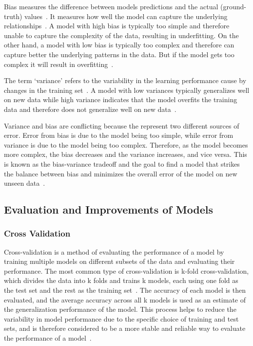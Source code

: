 Bias measures the difference between models predictions and the actual
(ground-truth) values~\cite[p. 51]{zhou_machinelearning_2021}.
It measures how well the model can capture the underlying
relationships~\cite[p. 7--8]{neal_biasvariancetradeofftextbooks_2019}.
A model with high bias is typically too simple and therefore unable to capture the complexity of the data, resulting
in underfitting.
On the other hand, a model with low bias is typically too complex and therefore can capture better the underlying
patterns in the data. But if the model gets too complex it will result in
overfitting~\cite[p. 20]{neal_biasvariancetradeofftextbooks_2019}.

The term `variance' refers to the variability in the learning performance cause by changes in the training
set~\cite[p. 51]{zhou_machinelearning_2021}.
A model with low variances typically generalizes well on new data while high variance indicates that the model
overfits the training data and therefore does not generalize well on new
data~\cite[p. 7--8]{neal_biasvariancetradeofftextbooks_2019}.

Variance and bias are conflicting because the represent two different sources of error.
Error from bias is due to the model being too simple, while error from variance is due to the model being too
complex.
Therefore, as the model becomes more complex, the bias decreases and the variance increases, and vice versa.
This is known as the bias-variance tradeoff and the goal to find a model that strikes the balance between
bias and minimizes the overall error of the model on new unseen
data~\cite[p. 9]{neal_biasvariancetradeofftextbooks_2019}.

\subsection{Evaluation and Improvements of Models}\label{subsec:evaluations-and-improvements-of-models}

\subsubsection{Cross Validation}\label{subsubsec:cross-validation}
Cross-validation is a method of evaluating the performance of a model by training
multiple models on different subsets of the data and evaluating their performance.
The most common type of cross-validation is k-fold cross-validation, which divides the data into k folds and trains k
models, each using one fold as the test set and the rest as the training
set~\cite[p. 252--26ß]{muller_introductionmachinelearning_2016}.
The accuracy of each model is then evaluated, and the average accuracy across all k
models is used as an estimate of the generalization performance of the model.
This process helps to reduce the variability in model performance due to the specific choice of training and test
sets, and is therefore considered to be a more stable and reliable way to evaluate the performance of a
model~\cite[p. 252--260]{muller_introductionmachinelearning_2016}.

